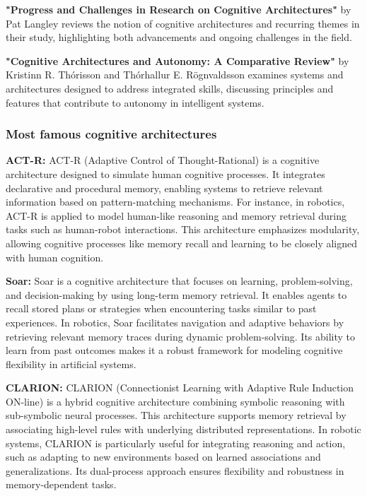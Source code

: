             \textbf{"Progress and Challenges in Research on Cognitive Architectures"} by Pat Langley reviews the notion of cognitive architectures and recurring themes in their study, highlighting both advancements and ongoing challenges in the field. 

            \textbf{"Cognitive Architectures and Autonomy: A Comparative Review"} by Kristinn R. Thórisson and Thórhallur E. Rögnvaldsson examines systems and architectures designed to address integrated skills, discussing principles and features that contribute to autonomy in intelligent systems. 



        \subsubsection{Most famous cognitive architectures}
            \textbf{ACT-R:} ACT-R (Adaptive Control of Thought-Rational) is a cognitive architecture designed to simulate human cognitive processes. It integrates declarative and procedural memory, enabling systems to retrieve relevant information based on pattern-matching mechanisms. For instance, in robotics, ACT-R is applied to model human-like reasoning and memory retrieval during tasks such as human-robot interactions. This architecture emphasizes modularity, allowing cognitive processes like memory recall and learning to be closely aligned with human cognition. 

            \textbf{Soar:} Soar is a cognitive architecture that focuses on learning, problem-solving, and decision-making by using long-term memory retrieval. It enables agents to recall stored plans or strategies when encountering tasks similar to past experiences. In robotics, Soar facilitates navigation and adaptive behaviors by retrieving relevant memory traces during dynamic problem-solving. Its ability to learn from past outcomes makes it a robust framework for modeling cognitive flexibility in artificial systems. 

            \textbf{CLARION:} CLARION (Connectionist Learning with Adaptive Rule Induction ON-line) is a hybrid cognitive architecture combining symbolic reasoning with sub-symbolic neural processes. This architecture supports memory retrieval by associating high-level rules with underlying distributed representations. In robotic systems, CLARION is particularly useful for integrating reasoning and action, such as adapting to new environments based on learned associations and generalizations. Its dual-process approach ensures flexibility and robustness in memory-dependent tasks. 

